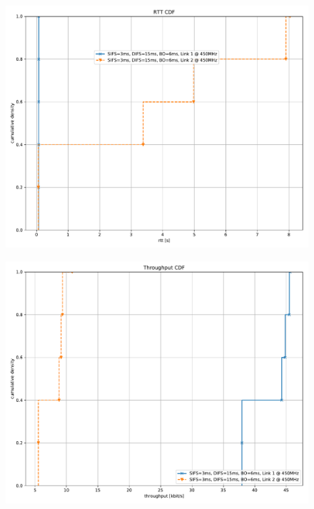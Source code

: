 \documentclass{article}
\begin{document}
\begin{figure}
	\includegraphics[width=\textwidth]{rb_dual/link_1_2/cdf/rtt_cdf}
\end{figure}

\begin{figure}
	\includegraphics[width=\textwidth]{rb_dual/link_1_2/cdf/throughput_cdf}
\end{figure}
\end{document}
